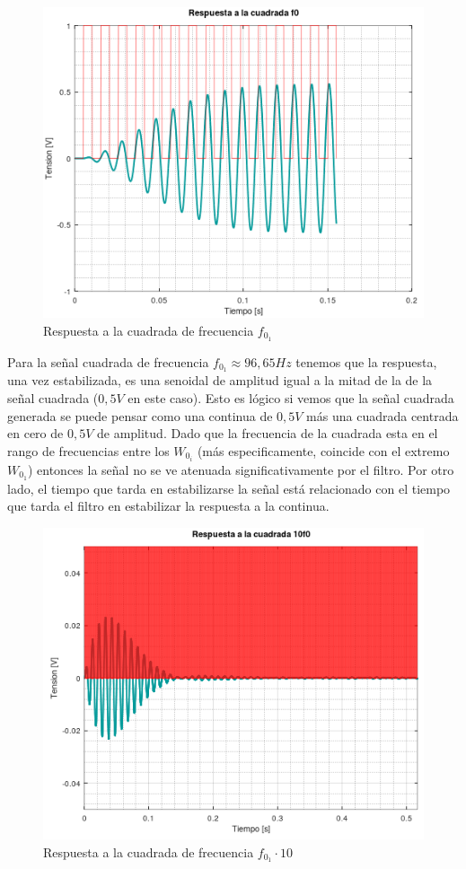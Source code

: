 \documentclass[11pt,a4paper]{report}
\begin{document}
\bigskip
\begin{figure}[h!]
\includegraphics[scale=1]{RtaCuadradaWo12.png}
\caption{Respuesta a la cuadrada de frecuencia $f_{0_{1}}$}
\end{figure}

Para la señal cuadrada de frecuencia $f_{0_{1}} \approx 96,65Hz$ tenemos que la 
respuesta, una vez estabilizada, es una senoidal de amplitud igual a la mitad de la 
de la señal cuadrada ($0,5V$ en este caso). Esto es lógico si vemos que la señal 
cuadrada generada se puede pensar como una continua de $0,5V$ más una cuadrada centrada en cero de $0,5V$ de amplitud. Dado que la frecuencia de la cuadrada esta en el rango de frecuencias entre los $W_{0_{i}}$ (más especificamente, coincide con el extremo $W_{0_{1}}$) entonces  la señal no se ve atenuada significativamente por el filtro. Por otro lado, el tiempo que tarda en estabilizarse la señal está relacionado con el tiempo que tarda el filtro en estabilizar la respuesta a la continua.

\newpage
\begin{figure}[h!]
\includegraphics[scale=1]{RtaCuadradaWo13.png}
\caption{Respuesta a la cuadrada de frecuencia $f_{0_{1}} \cdot 10$}
\end{figure}
\afterpage{\clearpage}
\end{document}
